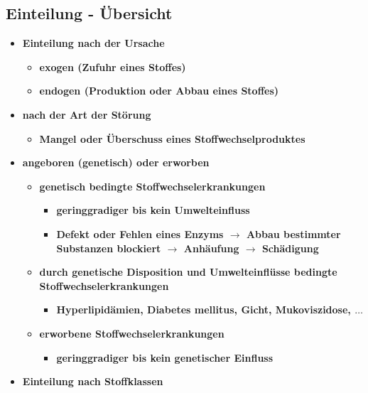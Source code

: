 \subsection{Einteilung - Übersicht}
	\begin{itemize}
		\item \textbf{Einteilung nach der Ursache}
			\begin{itemize}
				\item \textbf{exogen (Zufuhr eines Stoffes)}
				\item \textbf{endogen (Produktion oder Abbau eines Stoffes)}
			\end{itemize}
		\item \textbf{nach der Art der Störung}
			\begin{itemize}
				\item \textbf{Mangel oder Überschuss eines Stoffwechselproduktes}
			\end{itemize}
		\item \textbf{angeboren (genetisch) oder erworben}
			\begin{itemize}
				\item \textbf{genetisch bedingte Stoffwechselerkrankungen}
					\begin{itemize}
						\item \textbf{geringgradiger bis kein Umwelteinfluss}
						\item \textbf{Defekt oder Fehlen eines Enzyms $\rightarrow$ Abbau bestimmter Substanzen blockiert $\rightarrow$ Anhäufung $\rightarrow$ Schädigung}
					\end{itemize}
			\end{itemize}		
			\begin{itemize}
				\item \textbf{durch genetische Disposition und Umwelteinflüsse bedingte Stoffwechselerkrankungen}
					\begin{itemize}
						\item \textbf{Hyperlipidämien, Diabetes mellitus, Gicht, Mukoviszidose, $\dots$}
					\end{itemize}
				\item \textbf{erworbene Stoffwechselerkrankungen}
					\begin{itemize}
						\item \textbf{geringgradiger bis kein genetischer Einfluss}
					\end{itemize}
			\end{itemize}
		\item \textbf{Einteilung nach Stoffklassen}
			\begin{itemize}

\end{itemize}
\end{itemize}
